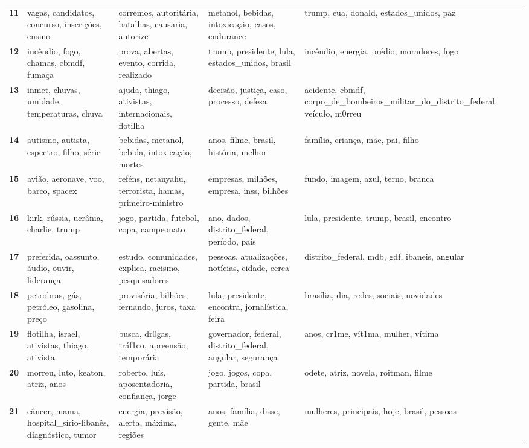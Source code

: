 \begin{xltabular}{\textwidth}{@{}l >{\RaggedRight\arraybackslash}X >{\RaggedRight\arraybackslash}X >{\RaggedRight\arraybackslash}X >{\RaggedRight\arraybackslash}X@{}}
    \textbf{11} & vagas, candidatos, concurso, inscrições, ensino & corremos, autoritária, batalhas, causaria, autorize & metanol, bebidas, intoxicação, casos, endurance & trump, eua, donald, estados\_unidos, paz \\
    \textbf{12} & incêndio, fogo, chamas, cbmdf, fumaça & prova, abertas, evento, corrida, realizado & trump, presidente, lula, estados\_unidos, brasil & incêndio, energia, prédio, moradores, fogo \\
    \textbf{13} & inmet, chuvas, umidade, temperaturas, chuva & ajuda, thiago, ativistas, internacionais, flotilha & decisão, justiça, caso, processo, defesa & acidente, cbmdf, corpo\_de\_bombeiros\_militar\_do\_distrito\_federal, veículo, m0rreu \\
    \textbf{14} & autismo, autista, espectro, filho, série & bebidas, metanol, bebida, intoxicação, mortes & anos, filme, brasil, história, melhor & família, criança, mãe, pai, filho \\
    \textbf{15} & avião, aeronave, voo, barco, spacex & reféns, netanyahu, terrorista, hamas, primeiro-ministro & empresas, milhões, empresa, inss, bilhões & fundo, imagem, azul, terno, branca \\
    \textbf{16} & kirk, rússia, ucrânia, charlie, trump & jogo, partida, futebol, copa, campeonato & ano, dados, distrito\_federal, período, país & lula, presidente, trump, brasil, encontro \\
    \textbf{17} & preferida, oassunto, áudio, ouvir, liderança & estudo, comunidades, explica, racismo, pesquisadores & pessoas, atualizações, notícias, cidade, cerca & distrito\_federal, mdb, gdf, ibaneis, angular \\
    \textbf{18} & petrobras, gás, petróleo, gasolina, preço & provisória, bilhões, fernando, juros, taxa & lula, presidente, encontra, jornalística, feira & brasília, dia, redes, sociais, novidades \\
    \textbf{19} & flotilha, israel, ativistas, thiago, ativista & busca, dr0gas, tráf1co, apreensão, temporária & governador, federal, distrito\_federal, angular, segurança & anos, cr1me, vít1ma, mulher, vítima \\
    \textbf{20} & morreu, luto, keaton, atriz, anos & roberto, luís, aposentadoria, confiança, jorge & jogo, jogos, copa, partida, brasil & odete, atriz, novela, roitman, filme \\
    \textbf{21} & câncer, mama, hospital\_sírio-libanês, diagnóstico, tumor & energia, previsão, alerta, máxima, regiões & anos, família, disse, gente, mãe & mulheres, principais, hoje, brasil, pessoas \\

\end{xltabular}

